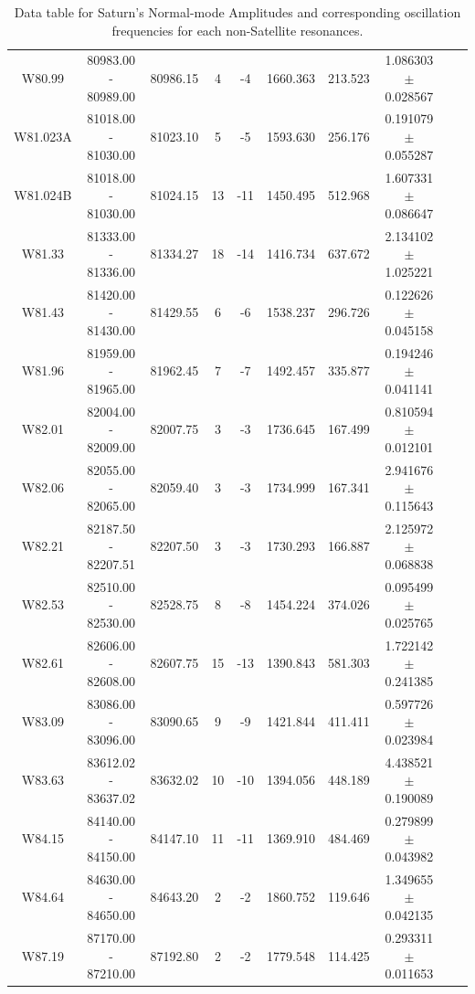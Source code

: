 \documentclass{article}
\begin{document}
\begin{table}[h]
{\begin{tabular}{|c|c|c|c|c|c|c|c|c|c|}
W80.99 & 80983.00 - 80989.00 & 80986.15 & 4 & -4 & 1660.363 & 213.523 & 1.086303 $\pm$ 0.028567 \\
W81.023A & 81018.00 - 81030.00 & 81023.10 & 5 & -5 & 1593.630 & 256.176 & 0.191079 $\pm$ 0.055287 \\
W81.024B & 81018.00 - 81030.00 & 81024.15 & 13 & -11 & 1450.495 & 512.968 & 1.607331 $\pm$ 0.086647 \\
W81.33 & 81333.00 - 81336.00 & 81334.27 & 18 & -14 & 1416.734 & 637.672 & 2.134102 $\pm$ 1.025221 \\
W81.43 & 81420.00 - 81430.00 & 81429.55 & 6 & -6 & 1538.237 & 296.726 & 0.122626 $\pm$ 0.045158 \\
W81.96 & 81959.00 - 81965.00 & 81962.45 & 7 & -7 & 1492.457 & 335.877 & 0.194246 $\pm$ 0.041141 \\
W82.01 & 82004.00 - 82009.00 & 82007.75 & 3 & -3 & 1736.645 & 167.499 & 0.810594 $\pm$ 0.012101 \\
W82.06 & 82055.00 - 82065.00 & 82059.40 & 3 & -3 & 1734.999 & 167.341 & 2.941676 $\pm$ 0.115643 \\
W82.21 & 82187.50 - 82207.51 & 82207.50 & 3 & -3 & 1730.293 & 166.887 & 2.125972 $\pm$ 0.068838 \\
W82.53 & 82510.00 - 82530.00 & 82528.75 & 8 & -8 & 1454.224 & 374.026 & 0.095499 $\pm$ 0.025765 \\
W82.61 & 82606.00 - 82608.00 & 82607.75 & 15 & -13 & 1390.843 & 581.303 & 1.722142 $\pm$ 0.241385 \\
W83.09 & 83086.00 - 83096.00 & 83090.65 & 9 & -9 & 1421.844 & 411.411 & 0.597726 $\pm$ 0.023984 \\
W83.63 & 83612.02 - 83637.02 & 83632.02 & 10 & -10 & 1394.056 & 448.189 & 4.438521 $\pm$ 0.190089 \\
W84.15 & 84140.00 - 84150.00 & 84147.10 & 11 & -11 & 1369.910 & 484.469 & 0.279899 $\pm$ 0.043982 \\
W84.64 & 84630.00 - 84650.00 & 84643.20 & 2 & -2 & 1860.752 & 119.646 & 1.349655 $\pm$ 0.042135 \\
W87.19 & 87170.00 - 87210.00 & 87192.80 & 2 & -2 & 1779.548 & 114.425 & 0.293311 $\pm$ 0.011653 \\
\hline
\end{tabular}
\vspace{-1.5cm}
}
\caption{Data table for Saturn's Normal-mode Amplitudes and corresponding oscillation frequencies for each non-Satellite resonances.}
\end{table}

\end{document}
